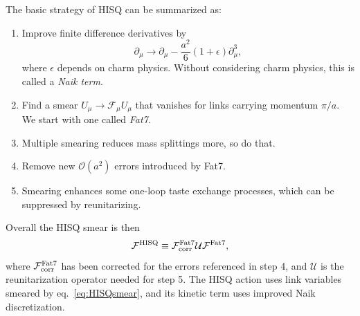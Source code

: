 The basic strategy of HISQ can be summarized as:
\begin{enumerate}
  \item Improve finite difference derivatives by 
        \vspace{-1mm}
        \begin{equation*}
         \partial_\mu\to\partial_\mu-\frac{a^2}{6}(1+\epsilon)\partial_\mu^3,
        \end{equation*}
        where $\epsilon$ depends on charm physics. Without considering
        charm physics, this is called a {\it Naik term}.
  \item Find a smear $U_\mu\to\mathcal{F}_\mu U_\mu$ that vanishes
        for links carrying momentum $\pi/a$. We start with one
        called {\it Fat7}.
  \item Multiple smearing reduces mass splittings more, so do that.
  \item Remove new $\mathcal{O}(a^2)$ errors introduced by Fat7.
  \item Smearing enhances some one-loop taste exchange processes,
        which can be suppressed by reunitarizing.
\end{enumerate}
Overall the HISQ smear is then
\begin{equation}\label{eq:HISQsmear}
\mathcal{F}^{\rm HISQ}\equiv
\mathcal{F}^{\rm Fat7}_{\rm corr}\mathcal{U}\mathcal{F}^{\rm Fat7},
\end{equation}
where $\mathcal{F}^{\rm Fat7}_{\rm corr}$ has been corrected for the
errors referenced in step 4, and $\mathcal{U}$ is the reunitarization
operator needed for step 5. The HISQ action uses link variables smeared
by eq.~\eqref{eq:HISQsmear}, and its kinetic term uses improved
Naik discretization.

